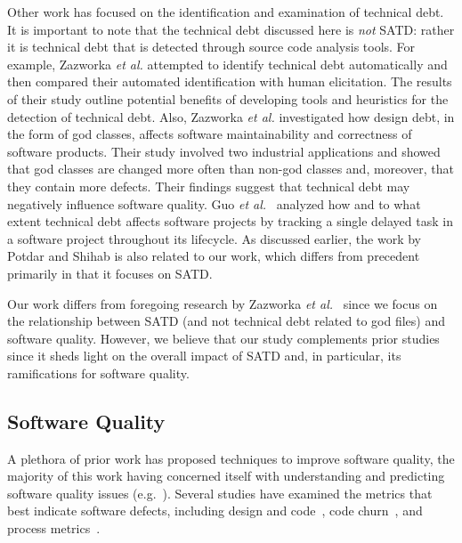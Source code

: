 Other work has focused on the identification and examination of technical debt. It is important to note that the technical debt discussed here is \emph{not} SATD: rather it is technical debt that is detected through source code analysis tools. For example,  Zazworka {\em et al.} \cite{Zazworka:2013} attempted to identify technical debt automatically and then compared their automated identification with human elicitation. The results of their study outline potential benefits of developing tools and heuristics for the detection of technical debt. Also, Zazworka {\em et al.} \cite{zazworka2011investigating} investigated how design debt, in the form of god classes, affects software maintainability and correctness of software products. Their study involved two industrial applications and showed that god classes are changed more often than non-god classes and, moreover, that they contain more defects. Their findings suggest that technical debt may negatively influence software quality. Guo {\em et al.}~\cite{GuoSGCTSSS11} analyzed how and to what extent technical debt affects software projects by tracking a single delayed task in a software project throughout its lifecycle. As discussed earlier, the work by Potdar and Shihab \cite{ICSM_PotdarS14} is also related to our work, which differs from precedent primarily in that it focuses on SATD.


Our work differs from foregoing research by Zazworka {\em et al.}~\cite{zazworka2011investigating,Zazworka:2013} since we focus on the relationship between SATD (and not technical debt related to god files) and software quality. However, we believe that our study complements prior studies since it sheds light on the overall impact of SATD and, in particular, its ramifications for software quality.



\subsection{Software Quality}

A plethora of prior work has proposed techniques to improve software quality, the majority of this work having concerned itself with understanding and predicting software quality issues (e.g.~\cite{Zimmerman2008Springer}). Several studies have examined the metrics that best indicate software defects, including design and code~\cite{Jiang-promise-2008}, code churn~\cite{Nagappan-icse-2005}, and process metrics~\cite{Moser-icse-2008,Rahman-icse-2013}.

